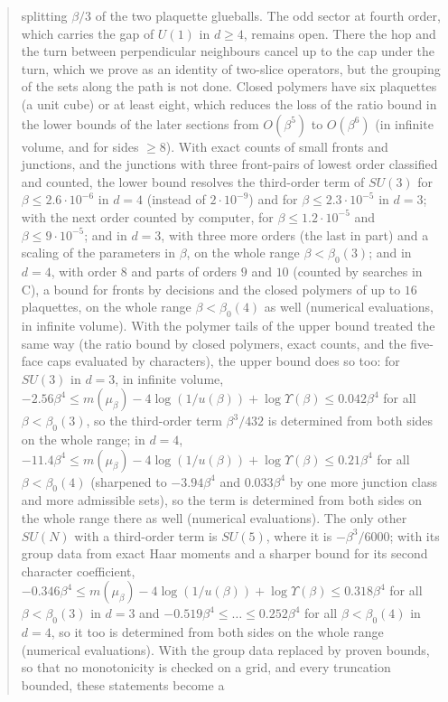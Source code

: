 \documentclass[11pt,a4paper]{article}
\theoremstyle{definition}
\theoremstyle{remark}
\begin{document}
\begin{abstract}
splitting $\beta/3$ of the two plaquette glueballs. The odd sector at fourth order, which carries the gap of $U(1)$ in $d\ge4$, remains open. There the hop and the
turn between perpendicular neighbours cancel up to the cap under the turn, which we prove as an identity of two-slice operators, but the grouping of the sets along
the path is not done. Closed polymers have six plaquettes (a unit cube) or at least eight, which reduces the loss of the ratio bound in the lower bounds of the later sections
from $O(\beta^5)$ to $O(\beta^6)$ (in infinite volume, and for sides $\ge8$). With
exact counts of small fronts and junctions, and the junctions with three front-pairs of lowest order classified and counted, the lower bound resolves the third-order term
of $SU(3)$ for $\beta\le2.6\cdot10^{-6}$ in $d=4$ (instead of $2\cdot10^{-9}$) and for $\beta\le2.3\cdot10^{-5}$ in $d=3$; with the next order counted by computer, for
$\beta\le1.2\cdot10^{-5}$ and $\beta\le9\cdot10^{-5}$; and in $d=3$, with three more orders (the last in part) and a scaling of the parameters in $\beta$, on the whole range
$\beta<\beta_0(3)$; and in $d=4$, with order $8$ and parts of orders $9$ and $10$ (counted by searches in C), a bound for fronts by decisions and the closed polymers of up to $16$ plaquettes, on the
whole range $\beta<\beta_0(4)$ as well (numerical evaluations, in infinite volume). With the polymer tails of the upper bound treated the same way (the ratio bound by closed polymers, exact counts, and the five-face caps evaluated by
characters), the upper bound does so too: for $SU(3)$ in $d=3$, in infinite volume, $-2.56\beta^4\le m(\mu_\beta)-4\log(1/u(\beta))+\log\Upsilon(\beta)\le0.042\beta^4$ for all $\beta<\beta_0(3)$, so the
third-order term $\beta^3/432$ is determined from both sides on the whole range; in $d=4$, $-11.4\beta^4\le m(\mu_\beta)-4\log(1/u(\beta))+\log\Upsilon(\beta)\le0.21\beta^4$ for all $\beta<\beta_0(4)$ (sharpened to $-3.94\beta^4$ and $0.033\beta^4$ by
one more junction class and more admissible sets), so the term is determined from both sides on the whole range there as well (numerical evaluations). The only other $SU(N)$ with a third-order term is $SU(5)$, where it is
$-\beta^3/6000$; with its group data from exact Haar moments and a sharper bound for its second character coefficient, $-0.346\beta^4\le m(\mu_\beta)-4\log(1/u(\beta))+\log\Upsilon(\beta)\le0.318\beta^4$
for all $\beta<\beta_0(3)$ in $d=3$ and $-0.519\beta^4\le\dots\le0.252\beta^4$ for all $\beta<\beta_0(4)$ in $d=4$, so it too is determined from both sides on the whole range
(numerical evaluations). With the group data replaced by proven bounds, so that no monotonicity is checked on a grid, and every truncation bounded, these statements become a

\end{abstract}
\end{document}
